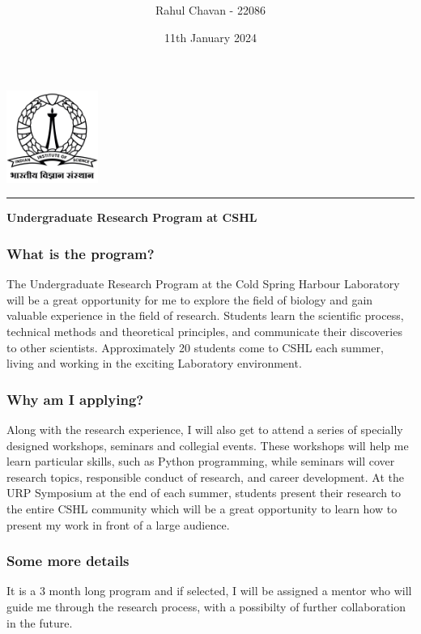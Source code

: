 \documentclass[12pt]{article}
\title{\textbf{}}
\author{Rahul Chavan - 22086}
\date{11th January 2024}
\renewcommand{\maketitle}{
 \begin{center}
    \includegraphics[width=3cm]{IISc_Master_Seal_Black.jpg}
    \vspace{0.5cm}

    \Large
    \textbf{\thetitle}
    
    \vspace{0.5cm}
    
    \Large
    \theauthor
    
    \vspace{0.2cm}
    
    \large
    \thedate
\vspace{0.2cm}

    \hrule  
    
    
  
  \end{center}
}
\begin{document}
\maketitle
    \begin{center} \Large
        \textbf{Undergraduate Research Program at CSHL}
    \end{center} 

\subsubsection*{What is the program?}
The Undergraduate Research Program at the Cold Spring Harbour Laboratory will be 
a great opportunity for me to explore the field of biology and gain valuable experience
in the field of research. Students learn the scientific process, technical methods and 
theoretical principles, and communicate their discoveries to other scientists. 
Approximately 20 students come to CSHL each summer, 
living and working in the exciting Laboratory environment.

\subsubsection*{Why am I applying?}
  Along with the research experience, I will also get to attend a series of specially designed workshops, seminars and collegial events.
These workshops will help me learn particular skills, such as Python programming, while seminars will cover research topics, 
responsible conduct of research, and career development.
At the URP Symposium at the end of each summer, students present their research to the entire CSHL community
which will be a great opportunity to learn how to present my work in front of a large audience.

\subsubsection*{Some more details}
It is a 3 month long program and if selected, I will be assigned a mentor who will guide me through the research process, 
with a possibilty of further collaboration in the future.
\end{document}
